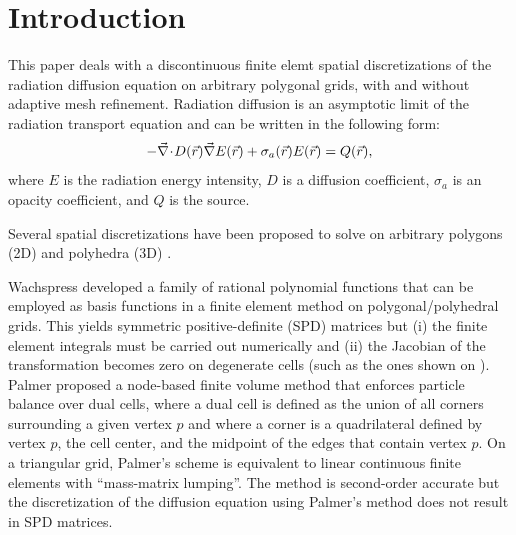 \section{Introduction} \label{sec_intro}

This paper deals with a discontinuous finite elemt spatial discretizations of the radiation 
diffusion equation on arbitrary polygonal grids, with and without adaptive mesh refinement. 
Radiation diffusion is an asymptotic limit of the radiation transport equation and can be 
written in the following form:
\begin{equation} \label{eq:radiation_diffusion}
- \vec{\nabla}\! \cdot \!  D(\vec{r}) \vec{\nabla} E(\vec{r}) + \sigma_a(\vec{r}) E(\vec{r}) = Q(\vec{r}) ,
\end{equation}
where $E$ is the radiation energy intensity, $D$ is a diffusion coefficient, $\sigma_a$ is 
an opacity coefficient, and $Q$ is the source.

Several spatial discretizations have been proposed to solve  on
arbitrary polygons (2D) and polyhedra (3D) \cite{Wachspress,PalmerLLNL,Palmer2005,MorelHall,MorelShashkov,%
BaileyAdams2008,KutnetsovMimetic}. 

Wachspress \cite{Wachspress} developed a family of rational polynomial functions that can be employed
as basis functions in a finite element method on polygonal/polyhedral grids. This yields
symmetric positive-definite (SPD) matrices but (i) the finite element integrals must be carried out 
numerically and (ii) the Jacobian of the transformation becomes zero on degenerate cells 
(such as the ones shown on ). Palmer \cite{PalmerLLNL,Palmer2005}
proposed a node-based finite volume method that enforces particle balance over dual cells,
where a dual cell is defined as the union of all corners surrounding a given vertex $p$ and where  
a corner is a quadrilateral defined by vertex $p$, the cell center, and the midpoint
of the edges that contain vertex $p$. On a triangular grid, Palmer's scheme is equivalent 
to linear continuous finite elements with ``mass-matrix lumping''. The method is 
second-order accurate but the discretization of the diffusion equation using Palmer's method 
does not result in SPD matrices.







